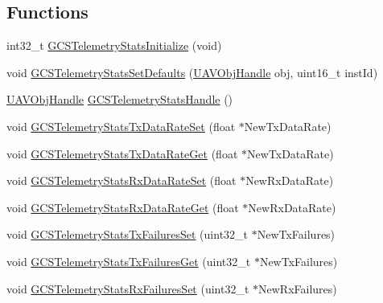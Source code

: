 \subsection*{\-Functions}
\begin{DoxyCompactItemize}
\item 
int32\-\_\-t \hyperlink{group___g_c_s_telemetry_stats_ga527f069869327d06bba46271b6d19922}{\-G\-C\-S\-Telemetry\-Stats\-Initialize} (void)
\item 
void \hyperlink{group___g_c_s_telemetry_stats_gaf85003e1d6af81726ccecf438a00c534}{\-G\-C\-S\-Telemetry\-Stats\-Set\-Defaults} (\hyperlink{targets_2_u_a_v_objects_2inc_2uavobjectmanager_8h_a279053e22be53ce9f895043aaeb91e3b}{\-U\-A\-V\-Obj\-Handle} obj, uint16\-\_\-t inst\-Id)
\item 
\hyperlink{targets_2_u_a_v_objects_2inc_2uavobjectmanager_8h_a279053e22be53ce9f895043aaeb91e3b}{\-U\-A\-V\-Obj\-Handle} \hyperlink{group___g_c_s_telemetry_stats_ga5ac84daad8e21310a580ae5b6b380fb0}{\-G\-C\-S\-Telemetry\-Stats\-Handle} ()
\item 
void \hyperlink{group___g_c_s_telemetry_stats_gabbb5e670b76e19582ec2b2f6f1d86c0a}{\-G\-C\-S\-Telemetry\-Stats\-Tx\-Data\-Rate\-Set} (float $\ast$\-New\-Tx\-Data\-Rate)
\item 
void \hyperlink{group___g_c_s_telemetry_stats_ga41ad99f09ece8dcdfbaf0ebc40913ed6}{\-G\-C\-S\-Telemetry\-Stats\-Tx\-Data\-Rate\-Get} (float $\ast$\-New\-Tx\-Data\-Rate)
\item 
void \hyperlink{group___g_c_s_telemetry_stats_gaf9fa4910893c0f9f16a298c24a2fa2ae}{\-G\-C\-S\-Telemetry\-Stats\-Rx\-Data\-Rate\-Set} (float $\ast$\-New\-Rx\-Data\-Rate)
\item 
void \hyperlink{group___g_c_s_telemetry_stats_ga29d41ac6aef35037c962552e10edca5f}{\-G\-C\-S\-Telemetry\-Stats\-Rx\-Data\-Rate\-Get} (float $\ast$\-New\-Rx\-Data\-Rate)
\item 
void \hyperlink{group___g_c_s_telemetry_stats_gaf21e5fb8a4fc576948021893580e5c57}{\-G\-C\-S\-Telemetry\-Stats\-Tx\-Failures\-Set} (uint32\-\_\-t $\ast$\-New\-Tx\-Failures)
\item 
void \hyperlink{group___g_c_s_telemetry_stats_ga7de1a2588c23793300dcbe75da6daca1}{\-G\-C\-S\-Telemetry\-Stats\-Tx\-Failures\-Get} (uint32\-\_\-t $\ast$\-New\-Tx\-Failures)
\item 
void \hyperlink{group___g_c_s_telemetry_stats_gacacb2b9291cf78176c276e444401159d}{\-G\-C\-S\-Telemetry\-Stats\-Rx\-Failures\-Set} (uint32\-\_\-t $\ast$\-New\-Rx\-Failures)
\item 

\end{DoxyCompactItemize}
